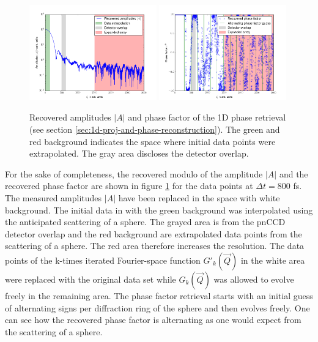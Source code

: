 \begin{figure}
	\centering
		\includegraphics[width=0.49\textwidth]{images/results/amplitude-discussion.png}
		\includegraphics[width=0.49\textwidth]{images/results/phase-discussion.png}
	\caption[Recovered Amplitudes $\left|A\right|$ and phase factor of 1D reconstruction]{Recovered amplitudes $\left|A\right|$ and phase factor of the 1D phase retrieval (see section \ref{sec:1d-proj-and-phase-reconstruction}). The green and red background indicates the space where initial data points were extrapolated. The gray area discloses the detector overlap.}
	\label{fig:amplitude-phase}
\end{figure}
For the sake of completeness, the recovered modulo of the amplitude $\left|A\right|$ and the recovered phase factor are shown in figure \ref{fig:amplitude-phase} for the data points at $\Delta t =800$ fs. The measured amplitudes $\left|A\right|$ have been replaced in the space with white background. The initial data in with the green background was interpolated using the anticipated scattering of a sphere. The grayed area is from the pnCCD detector overlap and the red background are extrapolated data points from the scattering of a sphere. The red area therefore increases the resolution. The data points of the k-times iterated Fourier-space function $G'_{k}(\vec{Q})$ in the white area were replaced with the original data set while $G_{k}(\vec{Q})$ was allowed to evolve freely in the remaining area. The phase factor retrieval starts with an initial guess of alternating signs per diffraction ring of the sphere and then evolves freely. One can see how the recovered phase factor is alternating as one would expect from the scattering of a sphere.\\
